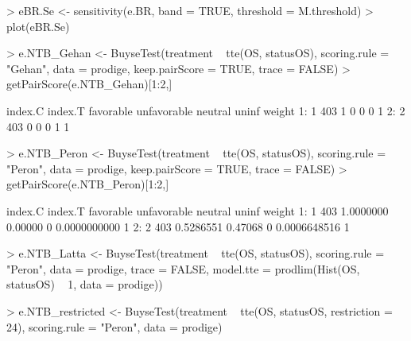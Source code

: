 \documentclass[12pt]{article}
\theoremstyle{definition}
\begin{document}
\begin{Rcode}
> eBR.Se <- sensitivity(e.BR, band = TRUE,
                      threshold = M.threshold)
> plot(eBR.Se)
\end{Rcode}


\begin{Rcode}
> e.NTB_Gehan <- BuyseTest(treatment ~ tte(OS, statusOS), scoring.rule = "Gehan", 
                         data = prodige, keep.pairScore = TRUE, trace = FALSE)
> getPairScore(e.NTB_Gehan)[1:2,]
\end{Rcode}
\begin{Routput}
   index.C index.T favorable unfavorable neutral uninf weight
1:       1     403         1           0       0     0      1
2:       2     403         0           0       0     1      1
\end{Routput}

\begin{Rcode}
> e.NTB_Peron <- BuyseTest(treatment ~ tte(OS, statusOS), scoring.rule = "Peron", 
                         data = prodige, keep.pairScore = TRUE, trace = FALSE)
> getPairScore(e.NTB_Peron)[1:2,]
\end{Rcode}
\begin{Routput}
   index.C index.T favorable unfavorable neutral        uninf weight
1:       1     403 1.0000000     0.00000       0 0.0000000000      1
2:       2     403 0.5286551     0.47068       0 0.0006648516      1
\end{Routput}


\begin{Rcode}
> e.NTB_Latta <- BuyseTest(treatment ~ tte(OS, statusOS), scoring.rule = "Peron", 
                           data = prodige, trace = FALSE,
                           model.tte = prodlim(Hist(OS, statusOS) ~ 1, data = prodige))
\end{Rcode}



\begin{Rcode}
> e.NTB_restricted <- BuyseTest(treatment ~ tte(OS, statusOS, restriction = 24), 
                                scoring.rule = "Peron", data = prodige)
\end{Rcode}


\clearpage
\end{document}
